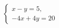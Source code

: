 \begin{ex}
	\begin{condition}
		\( \left\{
		\begin{array}{l}
			x-y=5,\\
			-4x+4y=20
		\end{array}
		\right. \)
	\end{condition}
\end{ex}